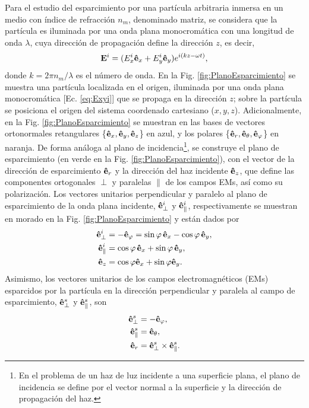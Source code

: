 Para  el estudio del esparcimiento por una partícula arbitraria inmersa en un medio con índice de refracción $n_m$, denominado  matriz, se considera que la partícula es iluminada por una onda plana monocromática con una longitud de onda $\lambda$, cuya dirección de propagación define la dirección $z$, es decir,
	\begin{align}
	\vb{E}^i = (E_x^i \vu{e}_x + E_y^i \vu{e}_y)e^{i(k z - \omega t)},
	\label{eq:Exyi}
	\end{align}
donde $k = 2\pi n_m /\lambda$ es el número de onda. En la Fig.  \ref{fig:PlanoEsparcimiento} se muestra  una partícula localizada en el origen,  iluminada por una onda plana monocromática [Ec. \eqref{eq:Exyi}] que se propaga en la dirección $z$; sobre la partícula se posiciona el origen del sistema coordenado cartesiano ($x,y,z$). Adicionalmente, en la Fig. \ref{fig:PlanoEsparcimiento} se muestran en las bases de vectores ortonormales retangulares \{$\vu{e}_x,\vu{e}_y,\vu{e}_z$\} en azul, y los polares \{$\vu{e}_r,\vu{e}_\theta,\vu{e}_\varphi$\} en naranja. De forma análoga al plano de incidencia\footnote{En el problema de un haz de luz incidente a una superficie plana, el plano de incidencia se define por el vector normal a
la superficie y la dirección de propagación del haz.}, se construye el plano de esparcimiento (en verde en la Fig. \ref{fig:PlanoEsparcimiento}), con el vector de la dirección de esparcimiento $\vu{e}_r$ y la dirección del haz incidente $\vu{e}_z$, que define las componentes ortogonales $\perp$ y paralelas $\parallel$ de los campos EMs, así como su polarización.   Los vectores unitarios perpendicular y paralelo al plano de esparcimiento de la onda plana incidente, $\vu{e}_{\perp}^i$  y $\vu{e}_{\parallel}^i$, respectivamente se muestran en morado en la Fig. \ref{fig:PlanoEsparcimiento} y están dados por%
\begin{subequations} \index{Polarización!respecto al plano de esparcimiento!paralela ($\parallel$)}\index{Polarización!respecto al plano de esparcimiento!perpendicular ($\perp$)}
%
	\begin{align}
	\vu{e}_{\perp}^i &=- \vu{e}_\varphi  = \sin\varphi\,\vu{e}_x - \cos\varphi\,\vu{e}_y, \\
	\vu{e}_{\parallel}^i &= \cos\varphi\,\vu{e}_x + \sin\varphi\,\vu{e}_y,\\
	\vu{e}_z &= \cos\varphi\vu{e}_x+\sin\varphi\vu{e}_y.
		\end{align}
	\label{eqs:vecInc}\end{subequations}
%
Asimismo, los vectores unitarios de los campos electromagnéticos (EMs) esparcidos por la partícula en la dirección perpendicular y paralela al campo de esparcimiento, $\vu{e}^s_\perp$ y $\vu{e}^s_\parallel$, son
%	
	\begin{subequations}
	\begin{align}
	\vu{e}_{\perp}^s &= - \vu{e}_\varphi,\\
	\vu{e}_{\parallel}^s &= \vu{e}_\theta,\\
	\vu{e}_r &= \vu{e}_\perp^s\times\vu{e}_\parallel^s.
	\end{align}	\label{eqs:vecScat}\end{subequations}
%

